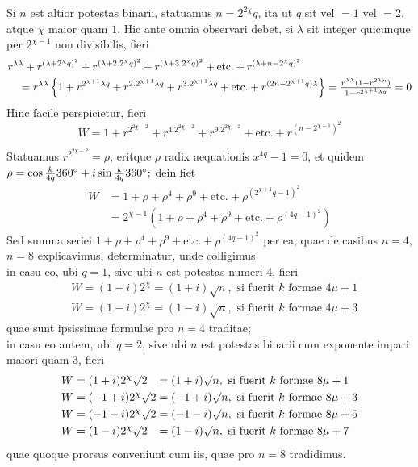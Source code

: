 \documentclass[twoside,12pt]{memoir}
\let\oldfrac\frac
\def\frac#1#2{\mathchoice{\tfrac{#1}{#2}}{\oldfrac{#1}{#2}}{\genfrac{}{}{}{2}{#1}{#2\mathstrut}}{\genfrac{}{}{}{3}{#1}{#2\mathstrut}}}
\begin{document}
Si \(n\) est altior potestas binarii, statuamus \(n=2^{2 \chi} q\), ita ut \(q\) sit vel \(=1\) vel \(=2\), atque \(\chi\) maior quam \(1\). Hic ante omnia observari debet, si \(\lambda\) sit integer quicunque per \(2^{\chi-1}\) non divisibilis, fieri
\[\begin{aligned}
& r^{\lambda \lambda}+r^{(\lambda+2^{\chi} q)^{2}}+r^{(\lambda+2.2^{\chi} q)^{2}}+r^{(\lambda+3.2^{\chi} q)^{2}}+\text{etc.}+r^{(\lambda+n-2^{\chi} q)^{2}} \\
& \quad=r^{\lambda \lambda}\left\{1+r^{2^{\chi+1} \lambda q}+r^{2.2^{\chi+1} \lambda q}+r^{3.2^{\chi+1} \lambda q}+\text{etc.}+r^{(2 n-2^{\chi+1} q) \lambda}\right\}=\frac{r^{\lambda \lambda}(1-r^{2 \lambda n})}{1-r^{2^{\chi+1} \lambda q}}=0
\end{aligned}\]
Hinc facile perspicietur, fieri
\[W=1+r^{2^{2 \chi-2}}+r^{4.2^{2 \chi-2}}+r^{9.2^{2 \chi-2}}+\text{etc.}+r^{(n-2^{\chi-1})^{2}}\]\pagebreak%

Statuamus \(r^{2^{2 \chi-2}}=\rho\), eritque \(\rho\) radix aequationis \(x^{4 q}-1=0\), et quidem \(\rho=\cos \frac{k}{4 q} 360^{\circ}+i \sin \frac{k}{4 q} 360^{\circ};\) dein fiet
\[\begin{aligned}
W & =1+\rho+\rho^{4}+\rho^{9}+\text{etc.}+\rho^{(2^{\chi+1} q-1)^{2}} \\
& =2^{\chi-1}(1+\rho+\rho^{4}+\rho^{9}+\text{etc.}+\rho^{(4 q-1)^{2}})
\end{aligned}\]
Sed summa seriei \(1+\rho+\rho^{4}+\rho^{9}+\text{etc.}+\rho^{(4 q-1)^{2}}\) per ea, quae de casibus \(n=4\), \(n=8\) explicavimus, determinatur, unde colligimus\\
in casu eo, ubi \(q=1\), sive ubi \(n\) est potestas numeri 4, fieri
\[\begin{aligned}
& W=(1+i) 2^{\chi}=(1+i) \surd n, \text{ si fuerit } k \text{ formae } 4 \mu+1 \\
& W=(1-i) 2^{\chi}=(1-i) \surd n, \text{ si fuerit } k \text{ formae } 4 \mu+3
\end{aligned}\]
quae sunt ipsissimae formulae pro \(n=4\) traditae;\\
in casu eo autem, ubi \(q=2\), sive ubi \(n\) est potestas binarii cum exponente impari maiori quam 3, fieri
\[\begin{alignedat}[t]{2}
W&=(1+i) 2^{\chi} \surd 2&&=(1+i) \surd n, \text{ si fuerit } k \text{ formae } 8 \mu+1 \\
W&=(-1+i) 2^{\chi} \surd 2&&=(-1+i) \surd n, \text{ si fuerit } k \text{ formae } 8 \mu+3 \\
W&=(-1-i) 2^{\chi} \surd 2&&=(-1-i) \surd n, \text{ si fuerit } k \text{ formae } 8 \mu+5 \\
W&=(1-i) 2^{\chi} \surd 2&&=(1-i) \surd n, \text{ si fuerit } k \text{ formae } 8 \mu+7
\end{alignedat}\]
quae quoque prorsus conveniunt cum iis, quae pro \(n=8\) tradidimus.
\end{document}
